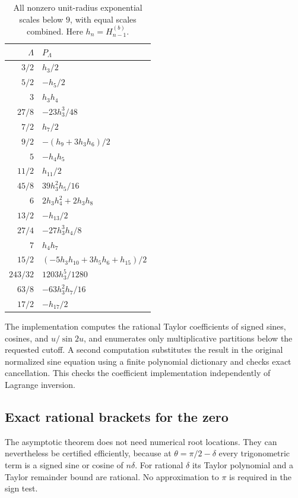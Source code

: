 \documentclass[11pt]{article}
\numberwithin{equation}{section}
\theoremstyle{plain}
\theoremstyle{definition}
\theoremstyle{remark}
\begin{document}
\begin{table}[htbp]
\centering
\small
\begin{tabular}{@{}r l@{}}
\toprule
$\Lambda$ & $P_\Lambda$\\
\midrule
$3/2$ & $h_3/2$\\[2pt]
$5/2$ & $-h_5/2$\\[2pt]
$3$ & $h_3h_4$\\[2pt]
$27/8$ & $-23h_3^3/48$\\[2pt]
$7/2$ & $h_7/2$\\[2pt]
$9/2$ & $-(h_9+3h_3h_6)/2$\\[2pt]
$5$ & $-h_4h_5$\\[2pt]
$11/2$ & $h_{11}/2$\\[2pt]
$45/8$ & $39h_3^2h_5/16$\\[2pt]
$6$ & $2h_3h_4^2+2h_3h_8$\\[2pt]
$13/2$ & $-h_{13}/2$\\[2pt]
$27/4$ & $-27h_3^3h_4/8$\\[2pt]
$7$ & $h_4h_7$\\[2pt]
$15/2$ & $(-5h_3h_{10}+3h_5h_6+h_{15})/2$\\[2pt]
$243/32$ & $1203h_3^5/1280$\\[2pt]
$63/8$ & $-63h_3^2h_7/16$\\[2pt]
$17/2$ & $-h_{17}/2$\\
\bottomrule
\end{tabular}
\caption{All nonzero unit-radius exponential scales below $9$, with equal scales combined. Here $h_n=H_{n-1}^{(b)}$.}
\label{tab:zero-scales}
\end{table}

The implementation computes the rational Taylor coefficients of signed
sines, cosines, and $u/\sin2u$, and enumerates only multiplicative
partitions below the requested cutoff. A second computation substitutes
the result in the original normalized sine equation using a finite
polynomial dictionary and checks exact cancellation. This checks the
coefficient implementation independently of Lagrange inversion.

\subsection{Exact rational brackets for the zero}
\label{sec:root-certificates}

The asymptotic theorem does not need numerical root locations. They
can nevertheless be certified efficiently, because at
$\theta=\pi/2-\delta$ every trigonometric term is a signed sine or
cosine of $n\delta$. For rational $\delta$ its Taylor polynomial and
a Taylor remainder bound are rational. No approximation to $\pi$
is required in the sign test.
\end{document}
